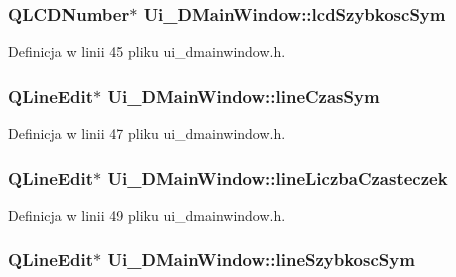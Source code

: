 \subsubsection[{lcd\+Szybkosc\+Sym}]{\setlength{\rightskip}{0pt plus 5cm}Q\+L\+C\+D\+Number$\ast$ Ui\+\_\+\+D\+Main\+Window\+::lcd\+Szybkosc\+Sym}\label{class_ui___d_main_window_a4eb8e2a87080f4f314eb96c52a82e39d}


Definicja w linii 45 pliku ui\+\_\+dmainwindow.\+h.

\hypertarget{class_ui___d_main_window_aad165daf4686baecb2ccd6709c629579}{}
\subsubsection[{line\+Czas\+Sym}]{\setlength{\rightskip}{0pt plus 5cm}Q\+Line\+Edit$\ast$ Ui\+\_\+\+D\+Main\+Window\+::line\+Czas\+Sym}\label{class_ui___d_main_window_aad165daf4686baecb2ccd6709c629579}


Definicja w linii 47 pliku ui\+\_\+dmainwindow.\+h.

\hypertarget{class_ui___d_main_window_a49c95cda7e035087a4367514e5540298}{}
\subsubsection[{line\+Liczba\+Czasteczek}]{\setlength{\rightskip}{0pt plus 5cm}Q\+Line\+Edit$\ast$ Ui\+\_\+\+D\+Main\+Window\+::line\+Liczba\+Czasteczek}\label{class_ui___d_main_window_a49c95cda7e035087a4367514e5540298}


Definicja w linii 49 pliku ui\+\_\+dmainwindow.\+h.

\hypertarget{class_ui___d_main_window_a73bafa5343a8e3cb7cd673a24be76008}{}
\subsubsection[{line\+Szybkosc\+Sym}]{\setlength{\rightskip}{0pt plus 5cm}Q\+Line\+Edit$\ast$ Ui\+\_\+\+D\+Main\+Window\+::line\+Szybkosc\+Sym}\label{class_ui___d_main_window_a73bafa5343a8e3cb7cd673a24be76008}


